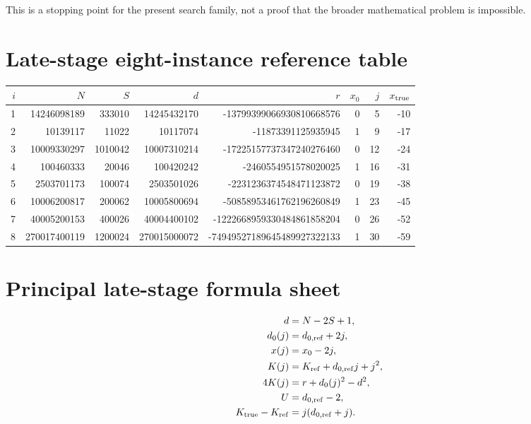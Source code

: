 \documentclass[11pt,a4paper]{article}
\begin{document}
This is a stopping point for the present search family, not a proof that the broader mathematical problem is impossible.

\appendix
\section{Late-stage eight-instance reference table}
\begin{longtable}{r|r|r|r|r|r|r|r}
\toprule
$i$ & $N$ & $S$ & $d$ & $r$ & $x_0$ & $j$ & $x_{\rm true}$\\
\midrule
1&14246098189&333010&14245432170&-13799399066930810668576&0&5&-10\\
2&10139117&11022&10117074&-11873391125935945&1&9&-17\\
3&10009330297&1010042&10007310214&-17225157737347240276460&0&12&-24\\
4&100460333&20046&100420242&-2460554951578020025&1&16&-31\\
5&2503701173&100074&2503501026&-2231236374548471123872&0&19&-38\\
6&10006200817&200062&10005800694&-50858953461762196260849&1&23&-45\\
7&40005200153&400026&40004400102&-1222668959330484861858204&0&26&-52\\
8&270017400119&1200024&270015000072&-74949527189645489927322133&1&30&-59\\\bottomrule
\end{longtable}

\section{Principal late-stage formula sheet}
\begin{align}
d&=N-2S+1,\\
d_0(j)&=d_{0,\rm ref}+2j,\\
x(j)&=x_0-2j,\\
K(j)&=K_{\rm ref}+d_{0,\rm ref}j+j^2,\\
4K(j)&=r+d_0(j)^2-d^2,\\
U&=d_{0,\rm ref}-2,\\
K_{\rm true}-K_{\rm ref}&=j(d_{0,\rm ref}+j).
\end{align}
\end{document}
